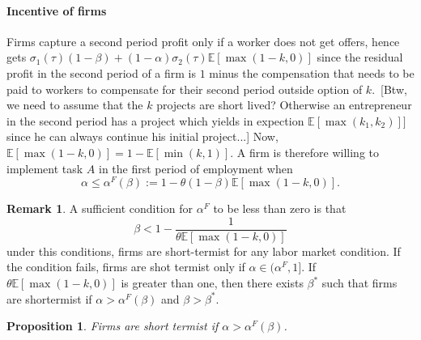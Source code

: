 \documentclass[12pt]{article}
\newtheorem{proposition}{Proposition} \theoremstyle{definition}
\newtheorem{remark}{Remark}
\newcommand{\E}[1]{\mathbb E[#1]}
\begin{document}
\paragraph{Incentive of firms}
Firms capture a second period profit only if a worker does not get offers, hence gets $\sigma_1(\tau)(1-\beta)+(1-\alpha)\sigma_2(\tau)\E{\max(1-k,0)}$ since the residual profit in the second period of a firm is $1$ minus the compensation that needs to be paid to workers to compensate for their second period outside option of $k$. [Btw, we need to assume that the $k$ projects are short lived? Otherwise an entrepreneur in the second period has a project which yields in expection $\E{\max(k_1,k_2)}]$ since he can always continue his initial project...]
%
Now, $\E{\max(1-k,0)}=1-\E{\min(k,1)}$. A firm is therefore willing to implement task $A$ in the first period of employment when
%
\begin{equation}
    \alpha \leq \alpha^F(\beta):=1-\theta  (1-\beta)\E{\max(1-k,0)}.
\end{equation}
%
\begin{remark}
    A sufficient condition for $\alpha^F$ to be less than zero is that
    \[
\beta < 1-  \frac{1}{\theta\E{\max(1-k,0)}}  
    \]
    under this conditions, firms are short-termist for any labor market condition. If the condition fails, firms are shot termist only if $\alpha\in(\alpha^F,1]$. If $\theta  \E{\max(1-k,0)}$ is greater than one, then there exists $\beta^*$ such that firms are shortermist if $\alpha>\alpha^F(\beta)$ and $\beta>\beta^*$.
\end{remark}
%
\begin{proposition}
 Firms are short termist if $\alpha >\alpha^F(\beta)$.
\end{proposition}
%
\end{document}
